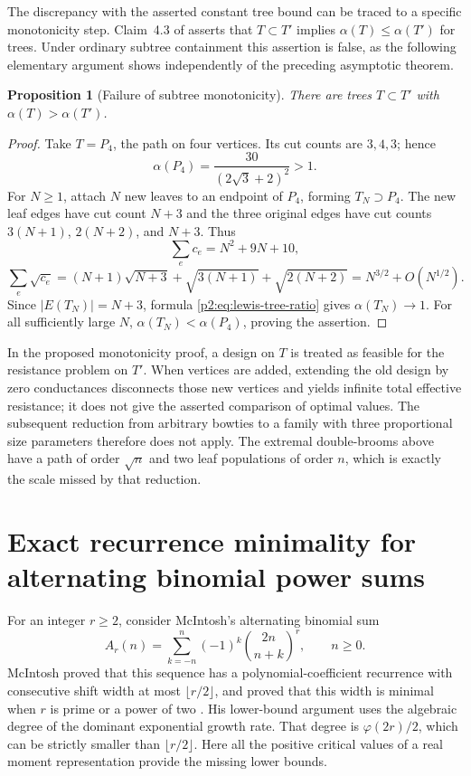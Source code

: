 \documentclass[11pt,a4paper]{article}
\newtheorem{proposition}[theorem]{Proposition}
\theoremstyle{definition}
\theoremstyle{remark}
\numberwithin{equation}{section}
\begin{document}
The discrepancy with the asserted constant tree bound can be traced
to a specific monotonicity step.  Claim~4.3 of
\cite{p2:SulimanWeinstein2023} asserts that $T\subset T'$ implies
$\alpha(T)\leq\alpha(T')$ for trees.  Under ordinary subtree
containment this assertion is false, as the following elementary
argument shows independently of the preceding asymptotic theorem.

\begin{proposition}[Failure of subtree monotonicity]
\label{p2:prop:lewis-nonmonotone}
There are trees $T\subset T'$ with $\alpha(T)>\alpha(T')$.
\end{proposition}

\begin{proof}
Take $T=P_4$, the path on four vertices.  Its cut counts are $3,4,3$;
hence
\[
 \alpha(P_4)=\frac{30}{(2\sqrt3+2)^2}>1.
\]
For $N\geq1$, attach $N$ new leaves to an endpoint of $P_4$, forming
$T_N\supset P_4$.  The new leaf edges have cut count $N+3$ and the
three original edges have cut counts
$3(N+1)$, $2(N+2)$, and $N+3$.  Thus
\[
 \sum_e c_e=N^2+9N+10,
\]
\[
 \sum_e\sqrt{c_e}
 =(N+1)\sqrt{N+3}+\sqrt{3(N+1)}+\sqrt{2(N+2)}
 =N^{3/2}+O(N^{1/2}).
\]
Since $|E(T_N)|=N+3$, formula \eqref{p2:eq:lewis-tree-ratio} gives
$\alpha(T_N)\to1$.  For all sufficiently large $N$,
$\alpha(T_N)<\alpha(P_4)$, proving the assertion.
\end{proof}

In the proposed monotonicity proof, a design on $T$ is treated as
feasible for the resistance problem on $T'$.  When vertices are
added, extending the old design by zero conductances disconnects
those new vertices and yields infinite total effective resistance;
it does not give the asserted comparison of optimal values.
The subsequent reduction from arbitrary bowties to a family with
three proportional size parameters therefore does not apply.
The extremal double-brooms above have a path of order $\sqrt n$ and
two leaf populations of order $n$, which is exactly the scale missed
by that reduction.


\section{Exact recurrence minimality for alternating binomial power sums}
\label{p2:sec:alternating}

For an integer $r\geq2$, consider McIntosh's alternating binomial sum
\begin{equation}\label{p2:eq:alt-definition}
 A_r(n)=\sum_{k=-n}^{n}(-1)^k\binom{2n}{n+k}^{r},\qquad n\geq0.
\end{equation}
McIntosh proved that this sequence has a polynomial-coefficient recurrence
with consecutive shift width at most $\lfloor r/2\rfloor$, and proved that
this width is minimal when $r$ is prime or a power of two
\cite[Theorems~1 and~2]{p3:McIntosh1993}. His lower-bound argument uses the
algebraic degree of the dominant exponential growth rate. That degree is
$\varphi(2r)/2$, which can be strictly smaller than $\lfloor r/2\rfloor$.
Here all the positive critical values of a real moment representation
provide the missing lower bounds.
\end{document}
